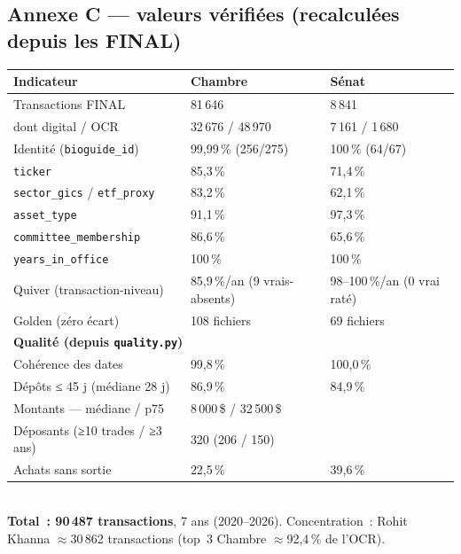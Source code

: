 \documentclass[11pt,a4paper]{article}
\newcommand{\co}[1]{\texttt{\small #1}}
\begin{document}
\subsection{Annexe C — valeurs vérifiées (recalculées depuis les FINAL)}
\label{anx:valeurs}
{\small
\begin{tabular}{p{6.6cm} p{4.2cm} p{4.2cm}}
\toprule
\bfseries Indicateur & \bfseries Chambre & \bfseries Sénat\\
\midrule
Transactions FINAL & 81\,646 & 8\,841 \\
\quad dont digital / OCR & 32\,676 / 48\,970 & 7\,161 / 1\,680 \\
Identité (\co{bioguide_id}) & 99,99\,\% (256/275) & 100\,\% (64/67) \\
\co{ticker} & 85,3\,\% & 71,4\,\% \\
\co{sector_gics} / \co{etf_proxy} & 83,2\,\% & 62,1\,\% \\
\co{asset_type} & 91,1\,\% & 97,3\,\% \\
\co{committee_membership} & 86,6\,\% & 65,6\,\% \\
\co{years_in_office} & 100\,\% & 100\,\% \\
Quiver (transaction-niveau) & 85,9\,\%/an (9 vrais-absents) & 98--100\,\%/an (0 vrai raté) \\
Golden (zéro écart) & 108 fichiers & 69 fichiers \\
\midrule
\multicolumn{3}{l}{\bfseries Qualité (depuis \co{quality.py})}\\
Cohérence des dates & 99,8\,\% & 100,0\,\% \\
Dépôts ≤ 45 j (médiane 28 j) & 86,9\,\% & 84,9\,\% \\
Montants — médiane / p75 & \multicolumn{2}{l}{8\,000\,\$ / 32\,500\,\$} \\
Déposants (≥10 trades / ≥3 ans) & \multicolumn{2}{l}{320 (206 / 150)} \\
Achats sans sortie & 22,5\,\% & 39,6\,\% \\
\bottomrule
\end{tabular}}\\[3pt]
{\footnotesize \textbf{Total~: 90\,487 transactions}, 7 ans (2020--2026). Concentration~: Rohit Khanna
$\approx$30\,862 transactions (top~3 Chambre $\approx$92,4\,\% de l'OCR).}
\end{document}
